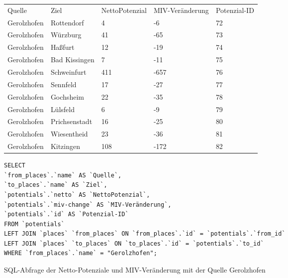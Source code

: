 \begin{tabular}{ l  l  l  l  l }
Quelle & Ziel & NettoPotenzial & MIV-Veränderung & Potenzial-ID\\ 
Gerolzhofen & Rottendorf & 4 & -6 & 72\\ 
Gerolzhofen & Würzburg & 41 & -65 & 73\\ 
Gerolzhofen & Haßfurt & 12 & -19 & 74\\ 
Gerolzhofen & Bad Kissingen & 7 & -11 & 75\\ 
Gerolzhofen & Schweinfurt & 411 & -657 & 76\\ 
Gerolzhofen & Sennfeld & 17 & -27 & 77\\ 
Gerolzhofen & Gochsheim & 22 & -35 & 78\\ 
Gerolzhofen & Lülsfeld & 6 & -9 & 79\\ 
Gerolzhofen & Prichsenstadt & 16 & -25 & 80\\ 
Gerolzhofen & Wiesentheid & 23 & -36 & 81\\ 
Gerolzhofen & Kitzingen & 108 & -172 & 82\\ 
\end{tabular}
\newline
\newline
\begin{listing}[htbp]
\begin{verbatim}
SELECT
`from_places`.`name` AS `Quelle`, 
`to_places`.`name` AS `Ziel`, 
`potentials`.`netto` AS `NettoPotenzial`, 
`potentials`.`miv-change` AS `MIV-Veränderung`, 
`potentials`.`id` AS `Potenzial-ID`
FROM `potentials`
LEFT JOIN `places` `from_places` ON `from_places`.`id` = `potentials`.`from_id`
LEFT JOIN `places` `to_places` ON `to_places`.`id` = `potentials`.`to_id`
WHERE `from_places`.`name` = "Gerolzhofen";
\end{verbatim}
\caption{SQL-Abfrage der Netto-Potenziale und MIV-Veränderung mit der Quelle Gerolzhofen}\label{lst-fz-gerolzhofen}
\end{listing}
    